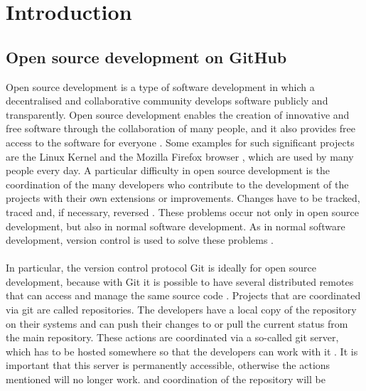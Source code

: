 \documentclass[sigconf]{acmart}
\begin{document}
\maketitle
\pagestyle{plain}


\section{Introduction}
\subsection{Open source development on GitHub}
Open source development is a type of software development in which a decentralised and collaborative 
community develops software publicly and transparently. Open source development enables the creation 
of innovative and free software through the collaboration of many people, and it also provides free access 
to the software for everyone \cite{shaikh2017governing, redhat2021ops}. Some examples for such significant 
projects are the Linux Kernel \cite{linux2021ops} and the Mozilla Firefox browser \cite{mozilla2021ops}, which are 
used by many people  every day. A particular difficulty in open source development is the coordination of the many 
developers who contribute to the development of the projects with their own extensions or improvements. Changes have 
to be tracked, traced and, if necessary, reversed \cite{shaikh2017governing}. These problems occur not only in open 
source development, but also in normal software development. As in normal software development, version control is 
used to solve these problems \cite{shaikh2017governing, ulrich2020dev}. \\ \\
In particular, the version control protocol Git 
is ideally for open source development, because with Git it is possible to have several distributed remotes that can 
access and manage the same source code \cite{git2021scm, ulrich2020dev}. Projects that are coordinated via git are 
called repositories. The developers have a local copy of the repository on their systems and can push their changes to or 
pull the current status from the main repository. These actions are coordinated via a so-called git server, which has to be 
hosted somewhere so that the developers can work with it \cite{git2021scm}. It is important that this server is permanently 
accessible, otherwise the actions mentioned will no longer work. and coordination of the repository will be 
\end{document}
